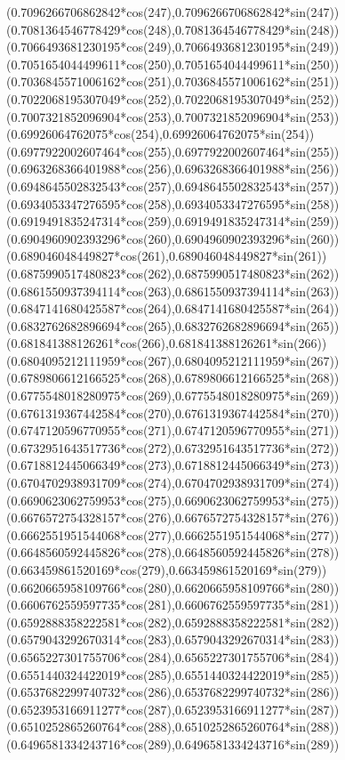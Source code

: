 {({0.7096266706862842*cos(247)},{0.7096266706862842*sin(247)})
({0.7081364546778429*cos(248)},{0.7081364546778429*sin(248)})
({0.7066493681230195*cos(249)},{0.7066493681230195*sin(249)})
({0.7051654044499611*cos(250)},{0.7051654044499611*sin(250)})
({0.7036845571006162*cos(251)},{0.7036845571006162*sin(251)})
({0.7022068195307049*cos(252)},{0.7022068195307049*sin(252)})
({0.7007321852096904*cos(253)},{0.7007321852096904*sin(253)})
({0.69926064762075*cos(254)},{0.69926064762075*sin(254)})
({0.6977922002607464*cos(255)},{0.6977922002607464*sin(255)})
({0.6963268366401988*cos(256)},{0.6963268366401988*sin(256)})
({0.6948645502832543*cos(257)},{0.6948645502832543*sin(257)})
({0.6934053347276595*cos(258)},{0.6934053347276595*sin(258)})
({0.6919491835247314*cos(259)},{0.6919491835247314*sin(259)})
({0.6904960902393296*cos(260)},{0.6904960902393296*sin(260)})
({0.689046048449827*cos(261)},{0.689046048449827*sin(261)})
({0.6875990517480823*cos(262)},{0.6875990517480823*sin(262)})
({0.6861550937394114*cos(263)},{0.6861550937394114*sin(263)})
({0.6847141680425587*cos(264)},{0.6847141680425587*sin(264)})
({0.6832762682896694*cos(265)},{0.6832762682896694*sin(265)})
({0.681841388126261*cos(266)},{0.681841388126261*sin(266)})
({0.6804095212111959*cos(267)},{0.6804095212111959*sin(267)})
({0.6789806612166525*cos(268)},{0.6789806612166525*sin(268)})
({0.6775548018280975*cos(269)},{0.6775548018280975*sin(269)})
({0.6761319367442584*cos(270)},{0.6761319367442584*sin(270)})
({0.6747120596770955*cos(271)},{0.6747120596770955*sin(271)})
({0.6732951643517736*cos(272)},{0.6732951643517736*sin(272)})
({0.6718812445066349*cos(273)},{0.6718812445066349*sin(273)})
({0.6704702938931709*cos(274)},{0.6704702938931709*sin(274)})
({0.6690623062759953*cos(275)},{0.6690623062759953*sin(275)})
({0.6676572754328157*cos(276)},{0.6676572754328157*sin(276)})
({0.6662551951544068*cos(277)},{0.6662551951544068*sin(277)})
({0.6648560592445826*cos(278)},{0.6648560592445826*sin(278)})
({0.663459861520169*cos(279)},{0.663459861520169*sin(279)})
({0.6620665958109766*cos(280)},{0.6620665958109766*sin(280)})
({0.6606762559597735*cos(281)},{0.6606762559597735*sin(281)})
({0.6592888358222581*cos(282)},{0.6592888358222581*sin(282)})
({0.6579043292670314*cos(283)},{0.6579043292670314*sin(283)})
({0.6565227301755706*cos(284)},{0.6565227301755706*sin(284)})
({0.6551440324422019*cos(285)},{0.6551440324422019*sin(285)})
({0.6537682299740732*cos(286)},{0.6537682299740732*sin(286)})
({0.6523953166911277*cos(287)},{0.6523953166911277*sin(287)})
({0.6510252865260764*cos(288)},{0.6510252865260764*sin(288)})
({0.6496581334243716*cos(289)},{0.6496581334243716*sin(289)})
}
